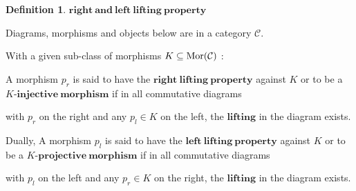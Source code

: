 \documentclass[a4paper]{article}
\theoremstyle{plain}
\theoremstyle{definition}
\newtheorem{defn}{Definition}[section]
\theoremstyle{remark}
\newcommand{\mc}[1]{\mathcal{#1}}
\newcommand{\mbf}[1]{\mathbf{#1}}
\newcommand{\mcC}{\mc C}
\DeclareMathOperator{\Mor}{\rm{Mor}}
\begin{document}
    \begin{defn}
        $\mbf{right\ and\ left\ lifting\ property}$
        \par Diagrams, morphisms and objects below are in a category $\mcC$.
        \par With a given sub-class of morphisms $K \subseteq \Mor(\mcC)$ :
        \\
        \par A morphism $p_r$ is said to have the
        $\mbf{right\ lifting\ property}$ against $K$ or to be
        a $K\mbf{\text{-}injective\ morphism}$
        if in all commutative diagrams
        with $p_r$ on the right and any $p_l \in K$ on the left,
        the $\mbf{lifting}$ in the diagram exists.
        \\
        \par Dually, A morphism $p_l$ is said to have the
        $\mbf{left\ lifting\ property}$ against $K$ or to be
        a $K\mbf{\text{-}projective\ morphism}$
        if in all commutative diagrams
        with $p_l$ on the left and any $p_r \in K$ on the right,
        the $\mbf{lifting}$ in the diagram exists.
    \end{defn}
\end{document}
